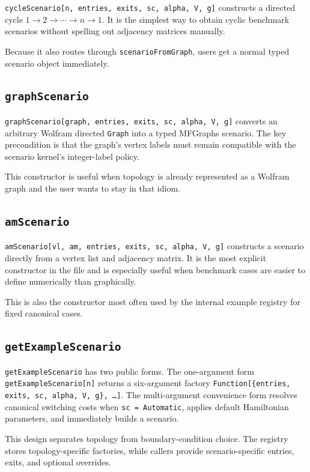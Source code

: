 \documentclass[11pt]{article}
\begin{document}
\texttt{cycleScenario[n, entries, exits, sc, alpha, V, g]} constructs a directed cycle $1 \to 2 \to \cdots \to n \to 1$. It is the simplest way to obtain cyclic benchmark scenarios without spelling out adjacency matrices manually.

Because it also routes through \texttt{scenarioFromGraph}, users get a normal typed scenario object immediately.

\subsection*{\texttt{graphScenario}}

\texttt{graphScenario[graph, entries, exits, sc, alpha, V, g]} converts an arbitrary Wolfram directed \texttt{Graph} into a typed MFGraphs scenario. The key precondition is that the graph's vertex labels must remain compatible with the scenario kernel's integer-label policy.

This constructor is useful when topology is already represented as a Wolfram graph and the user wants to stay in that idiom.

\subsection*{\texttt{amScenario}}

\texttt{amScenario[vl, am, entries, exits, sc, alpha, V, g]} constructs a scenario directly from a vertex list and adjacency matrix. It is the most explicit constructor in the file and is especially useful when benchmark cases are easier to define numerically than graphically.

This is also the constructor most often used by the internal example registry for fixed canonical cases.

\subsection*{\texttt{getExampleScenario}}

\texttt{getExampleScenario} has two public forms. The one-argument form \texttt{getExampleScenario[n]} returns a six-argument factory \texttt{Function[\{entries, exits, sc, alpha, V, g\}, \ldots]}. The multi-argument convenience form resolves canonical switching costs when \texttt{sc = Automatic}, applies default Hamiltonian parameters, and immediately builds a scenario.

This design separates topology from boundary-condition choice. The registry stores topology-specific factories, while callers provide scenario-specific entries, exits, and optional overrides.
\end{document}
